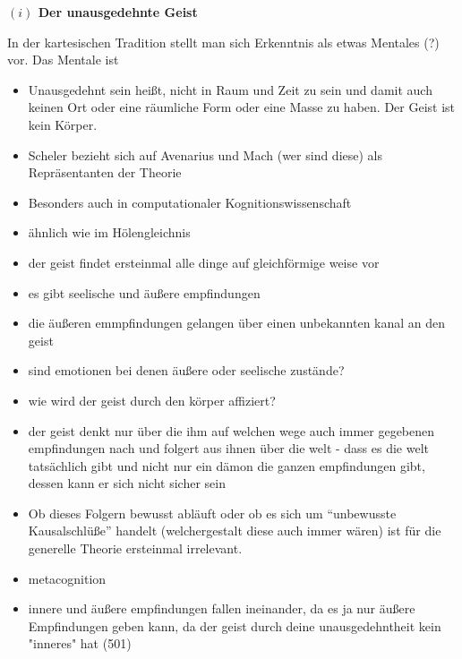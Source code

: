 \documentclass[a4paper, 12pt]{article}
\begin{document}
\begin{onehalfspace}
\vspace{5mm}
\noindent\textbf{$(i)$ Der unausgedehnte Geist}


In der kartesischen Tradition stellt man sich Erkenntnis als etwas Mentales (?) vor. Das Mentale ist 

\begin{itemize}
  \item Unausgedehnt sein heißt, nicht in Raum und Zeit zu sein und damit auch keinen Ort oder eine räumliche Form oder eine Masse zu haben. Der Geist ist kein Körper.  
  \item Scheler bezieht sich auf Avenarius und Mach (wer sind diese) als Repräsentanten der Theorie
  \item Besonders auch in computationaler Kognitionswissenschaft 
  \item ähnlich wie im Hölengleichnis
  \item der geist findet ersteinmal alle dinge auf gleichförmige weise vor
  \item es gibt seelische und äußere empfindungen
  \item die äußeren emmpfindungen gelangen über einen unbekannten kanal an den geist
  \item sind emotionen bei denen äußere oder seelische zustände? 
  \item wie wird der geist durch den körper affiziert?
  \item der geist denkt nur über die ihm auf welchen wege auch immer gegebenen empfindungen nach und folgert aus ihnen über die welt - dass es die welt tatsächlich gibt und nicht nur ein dämon die ganzen empfindungen gibt, dessen kann er sich nicht sicher sein
  \item Ob dieses Folgern bewusst abläuft oder ob es sich um "`unbewusste Kausalschlüße"' handelt (welchergestalt diese auch immer wären) ist für die generelle Theorie ersteinmal irrelevant.
  \item metacognition
  \item innere und äußere empfindungen fallen ineinander, da es ja nur äußere Empfindungen geben kann, da der geist durch deine unausgedehntheit kein "inneres" hat (501)

\end{itemize}
\end{onehalfspace}
\end{document}
